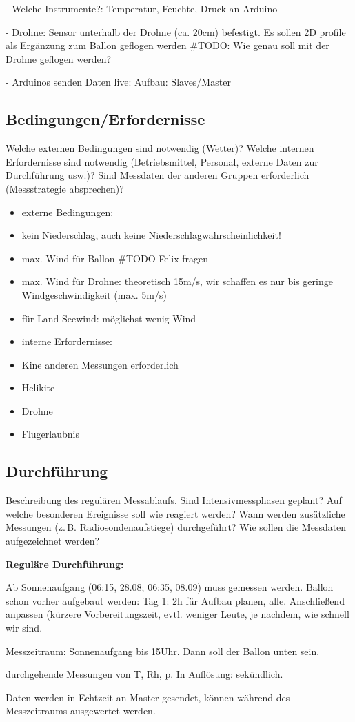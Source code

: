 \documentclass[a4paper,11pt,DIV=calc,tablecaptionabove,headinclude,twoside]{article}
\begin{document}
- Welche Instrumente?: Temperatur, Feuchte, Druck an Arduino

- Drohne: Sensor unterhalb der Drohne (ca. 20cm) befestigt. Es sollen 2D profile als Ergänzung zum Ballon geflogen werden #TODO: Wie genau soll mit der Drohne geflogen werden?

- Arduinos senden Daten live: Aufbau: Slaves/Master
\subsection{Bedingungen/Erfordernisse}
Welche externen Bedingungen sind notwendig (Wetter)? Welche internen Erfordernisse sind notwendig (Betriebsmittel, Personal, externe Daten zur Durchführung usw.)? Sind Messdaten der anderen Gruppen erforderlich (Messstrategie absprechen)?


\begin{itemize}
\item externe Bedingungen:
	\item kein Niederschlag, auch keine Niederschlagwahrscheinlichkeit!
	\item max. Wind für Ballon #TODO Felix fragen
	\item max. Wind für Drohne: theoretisch 15m/s, wir schaffen es nur bis geringe Windgeschwindigkeit (max. 5m/s)
	\item für Land-Seewind: möglichst wenig Wind\\
	
\item interne Erfordernisse:
	\item Kine anderen Messungen erforderlich
	\item Helikite
	\item Drohne
	\item Flugerlaubnis
\end{itemize}

\subsection{Durchführung}
Beschreibung des regulären Messablaufs. Sind Intensivmessphasen geplant? Auf welche besonderen Ereignisse soll wie reagiert werden? 
Wann werden zusätzliche Messungen (z.\,B. Radiosondenaufstiege) durchgeführt?
Wie sollen die Messdaten aufgezeichnet werden? 

\textbf{Reguläre Durchführung:}\\
\item Ab Sonnenaufgang (06:15, 28.08; 06:35, 08.09) muss gemessen werden. Ballon schon vorher aufgebaut werden: Tag 1: 2h für Aufbau planen, alle. Anschließend anpassen (kürzere Vorbereitungszeit, evtl. weniger Leute, je nachdem, wie schnell wir sind.
\item Messzeitraum: Sonnenaufgang bis 15Uhr. Dann soll der Ballon unten sein.
\item durchgehende Messungen von T, Rh, p. In Auflösung: sekündlich.
\item Daten werden in Echtzeit an Master gesendet, können während des Messzeitraums ausgewertet werden.
\end{document}
